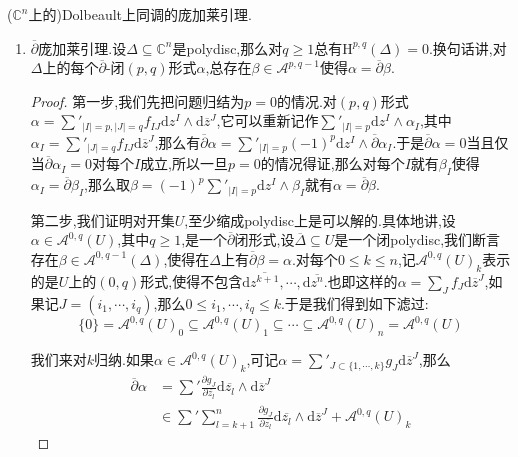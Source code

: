 ($\mathbb{C}^n$上的)Dolbeault上同调的庞加莱引理.
\begin{enumerate}
	\item $\overline{\partial}$庞加莱引理.设$\Delta\subseteq\mathbb{C}^n$是polydisc,那么对$q\ge1$总有$\mathrm{H}^{p,q}(\Delta)=0$.换句话讲,对$\Delta$上的每个$\overline{\partial}$-闭$(p,q)$形式$\alpha$,总存在$\beta\in\mathscr{A}^{p,q-1}$使得$\alpha=\overline{\partial}\beta$.
	\begin{proof}
		
		第一步,我们先把问题归结为$p=0$的情况.对$(p,q)$形式$\alpha=\sum'_{|I|=p,|J|=q}f_{IJ}\mathrm{d}z^I\wedge\mathrm{d}\overline{z}^J$,它可以重新记作$\sum'_{|I|=p}\mathrm{d}z^I\wedge\alpha_I$,其中$\alpha_I=\sum'_{|J|=q}f_{IJ}\mathrm{d}\overline{z}^J$,那么有$\overline{\partial}\alpha=\sum'_{|I|=p}(-1)^p\mathrm{d}z^I\wedge\overline{\partial}\alpha_I$.于是$\overline{\partial}\alpha=0$当且仅当$\overline{\partial}\alpha_I=0$对每个$I$成立,所以一旦$p=0$的情况得证,那么对每个$I$就有$\beta_I$使得$\alpha_I=\overline{\partial}\beta_I$,那么取$\beta=(-1)^p\sum'_{|I|=p}\mathrm{d}z^I\wedge\beta_I$就有$\alpha=\overline{\partial}\beta$.
		
		\qquad
		
		第二步,我们证明对开集$U$,至少缩成polydisc上是可以解的.具体地讲,设$\alpha\in\mathscr{A}^{0,q}(U)$,其中$q\ge1$,是一个$\overline{\partial}$闭形式,设$\overline{\Delta}\subseteq U$是一个闭polydisc,我们断言存在$\beta\in\mathscr{A}^{0,q-1}(\Delta)$,使得在$\Delta$上有$\overline{\partial}\beta=\alpha$.对每个$0\le k\le n$,记$\mathscr{A}^{0,q}(U)_k$表示的是$U$上的$(0,q)$形式,使得不包含$\mathrm{d}\overline{z^{k+1}},\cdots,\mathrm{d}\overline{z^n}$.也即这样的$\alpha=\sum_Jf_J\mathrm{d}\overline{z}^J$,如果记$J=(i_1,\cdots,i_q)$,那么$0\le i_1,\cdots,i_q\le k$.于是我们得到如下滤过:
		$$\{0\}=\mathscr{A}^{0,q}(U)_0\subseteq\mathscr{A}^{0,q}(U)_1\subseteq\cdots\subseteq\mathscr{A}^{0,q}(U)_n=\mathscr{A}^{0,q}(U)$$
		
		我们来对$k$归纳.如果$\alpha\in\mathscr{A}^{0,q}(U)_k$,可记$\alpha=\sum'_{J\subset\{1,\cdots,k\}}g_J\mathrm{d}\overline{z}^J$,那么
		\begin{align*}
			\overline{\partial}\alpha&=\sum'\frac{\partial g_J}{\partial\overline{z_l}}\mathrm{d}\overline{z_l}\wedge\mathrm{d}\overline{z}^J\\&\in\sum'\sum_{l=k+1}^n\frac{\partial g_J}{\partial\overline{z_l}}\mathrm{d}\overline{z_l}\wedge\mathrm{d}\overline{z}^J+\mathscr{A}^{0,q}(U)_k
		\end{align*}
		

\end{proof}
\end{enumerate}
